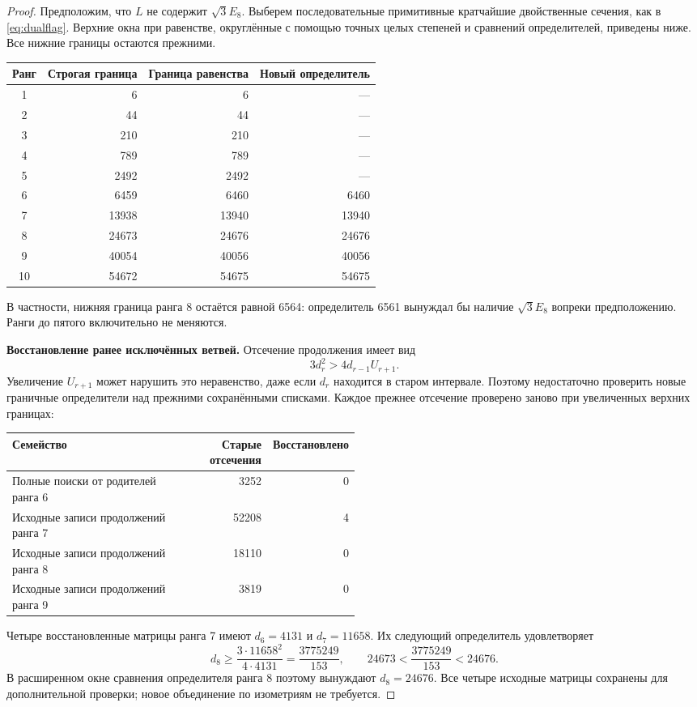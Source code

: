 \documentclass[11pt,a4paper]{article}
\theoremstyle{remark}\newtheorem{remark}[theorem]{Замечание}
\begin{document}
\begin{proof}
Предположим, что $L$ не содержит $\sqrt3E_8$. Выберем последовательные примитивные кратчайшие двойственные сечения, как в \eqref{eq:dualflag}. Верхние окна при равенстве, округлённые с помощью точных целых степеней и сравнений определителей, приведены ниже. Все нижние границы остаются прежними.
\begin{center}
\begin{tabular}{crrr}
\toprule
Ранг & Строгая граница & Граница равенства & Новый определитель\\\midrule
1&6&6&---\\
2&44&44&---\\
3&210&210&---\\
4&789&789&---\\
5&2492&2492&---\\
6&6459&6460&6460\\
7&13938&13940&13940\\
8&24673&24676&24676\\
9&40054&40056&40056\\
10&54672&54675&54675\\
\bottomrule
\end{tabular}
\end{center}
В частности, нижняя граница ранга 8 остаётся равной 6564: определитель 6561 вынуждал бы наличие $\sqrt3E_8$ вопреки предположению. Ранги до пятого включительно не меняются.

\textbf{Восстановление ранее исключённых ветвей.}
Отсечение продолжения имеет вид
\[
3d_r^2>4d_{r-1}U_{r+1}.
\]
Увеличение $U_{r+1}$ может нарушить это неравенство, даже если $d_r$ находится в старом интервале. Поэтому недостаточно проверить новые граничные определители над прежними сохранёнными списками. Каждое прежнее отсечение проверено заново при увеличенных верхних границах:
\begin{center}
\begin{tabular}{P{0.50\linewidth}rr}
\toprule
Семейство & Старые отсечения & Восстановлено\\\midrule
Полные поиски от родителей ранга 6 &3252&0\\
Исходные записи продолжений ранга 7 &52208&4\\
Исходные записи продолжений ранга 8 &18110&0\\
Исходные записи продолжений ранга 9 &3819&0\\
\bottomrule
\end{tabular}
\end{center}
Четыре восстановленные матрицы ранга 7 имеют $d_6=4131$ и $d_7=11658$. Их следующий определитель удовлетворяет
\begin{equation}\label{eq:restored7floor}
d_8\ge\frac{3\cdot11658^2}{4\cdot4131}
=\frac{3775249}{153},\qquad
24673<\frac{3775249}{153}<24676.
\end{equation}
В расширенном окне сравнения определителя ранга 8 поэтому вынуждают $d_8=24676$. Все четыре исходные матрицы сохранены для дополнительной проверки; новое объединение по изометриям не требуется.


\end{proof}
\end{document}
